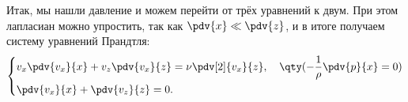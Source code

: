 Итак, мы нашли давление и можем перейти от трёх уравнений к двум. При этом лапласиан можно упростить, так как $\pdv{x} \ll \pdv{z}$, и в итоге получаем систему уравнений Прандтля:
\begin{equation}
	\label{eq:prandtl}
    \left\{\begin{aligned}
        &v_x \pdv{v_x}{x}+v_z\pdv{v_x}{z}=\nu\pdv[2]{v_x}{z}, \quad
        \qty(-\frac{1}{\rho}\pdv{p}{x}=0)\\
        &\pdv{v_x}{x}+\pdv{v_z}{z}=0.
    \end{aligned}\right.
\end{equation}





